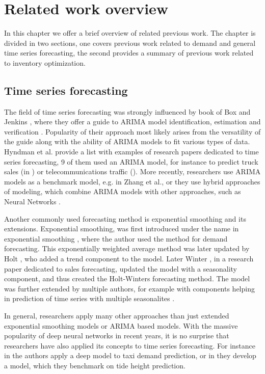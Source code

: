 \documentclass[11pt,a4paper]{article}
\begin{document}
\section{Related work overview}
\label{sec:related_work}
In this chapter we offer a brief overview of related previous work. The chapter is divided in two sections, one covers previous work related to demand and general time series forecasting, the second provides a summary of previous work related to inventory optimization.
\subsection{Time series forecasting}

The field of time series forecasting was strongly influenced by book of Box and Jenkins \cite{box2015time}, where they offer a guide to ARIMA model identification, estimation and verification \cite{de200625}. Popularity of their approach most likely arises from the versatility of the guide along with the ability of ARIMA models to fit various types of data. Hyndman et al. \cite{de200625} provide a list with examples of research papers dedicated to time series forecasting, 9 of them used an ARIMA model, for instance to predict truck sales (in \cite{heuts1988forecasting}) or telecommunications traffic (\cite{layton1986international}). More recently, researchers use ARIMA models as a benchmark model, e.g. in Zhang et al.\cite{zhang1998forecasting}, or they use hybrid approaches of modeling, which combine ARIMA models with other approaches, such as Neural Networks \cite{zhang2003time}. 

Another commonly used forecasting method is exponential smoothing and its extensions. Exponential smoothing, was first introduced under the name in exponential smoothing \cite{brown1957exponential}, where the author used the method for demand forecasting. This exponentially weighted average method was later updated by Holt \cite{holt2004forecasting}, who added a trend component to the model. Later Winter  \cite{winters1960forecasting}, in a research paper dedicated to sales forecasting, updated the model with a seasonality component, and thus created the Holt-Winters forecasting method. The model was further extended by multiple authors, for example with components helping in prediction of time series with multiple seasonalites \cite{shahin2017using}.

In general, researchers apply many other approaches than just extended exponential smoothing models or ARIMA based models. With the massive popularity of deep neural networks in recent years, it is no surprise that researchers have also applied its concepts to time series forecasting. For instance in \cite{zhu2017deep} the authors apply a deep model to taxi demand prediction, or in \cite{orozco2018mordred} they develop a model, which they benchmark on tide height prediction.
\end{document}
